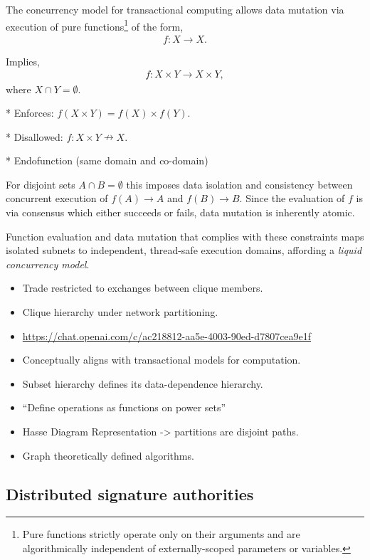 The concurrency model for transactional computing allows data mutation via execution of pure functions\footnote{Pure functions strictly operate only on their arguments and are algorithmically independent of externally-scoped parameters or variables.} of the form,
\begin{align}
	f: X\to X.
\end{align}

Implies,
\begin{align}
	f: X\times Y\to X\times Y,
\end{align}
where $X\cap Y=\emptyset$.

* Enforces: $f(X \times Y) = f(X) \times f(Y)$.

* Disallowed: $f: X \times Y \nrightarrow X$.

* Endofunction (same domain and co-domain)

For disjoint sets \mbox{$A \cap B = \emptyset$} this imposes data isolation and consistency between concurrent execution of \mbox{$f(A)\to A$} and \mbox{$f(B)\to B$}. Since the evaluation of $f$ is via consensus which either succeeds or fails, data mutation is inherently atomic.

Function evaluation and data mutation that complies with these constraints maps isolated subnets to independent, thread-safe execution domains, affording a \emph{liquid concurrency model}.

\begin{itemize}
	\item Trade restricted to exchanges between clique members.
	\item Clique hierarchy under network partitioning.
	\item \url{https://chat.openai.com/c/ac218812-aa5e-4003-90ed-d7807cea9e1f}
	\item Conceptually aligns with transactional models for computation.
	\item Subset hierarchy defines its data-dependence hierarchy.
	\item ``Define operations as functions on power sets''
	\item Hasse Diagram Representation -> partitions are disjoint paths.
	\item Graph theoretically defined algorithms.
\end{itemize}

\subsection{Distributed signature authorities}

